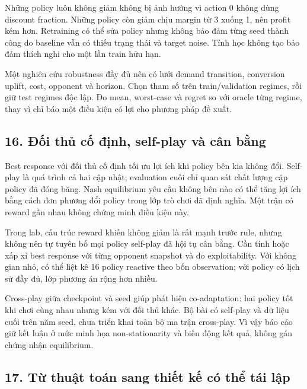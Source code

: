 Những policy luôn không giảm không bị ảnh hưởng vì action 0 không dùng
discount fraction. Những policy còn giảm chịu margin từ 3 xuống 1, nên
profit kém hơn. Retraining có thể sửa policy nhưng không bảo đảm từng
seed thành công do baseline vẫn có thiếu trạng thái và target noise.
Tính học không tạo bảo đảm thích nghi cho một lần train hữu hạn.

Một nghiên cứu robustness đầy đủ nên có lưới demand transition,
conversion uplift, cost, opponent và horizon. Chọn tham số trên
train/validation regimes, rồi giữ test regimes độc lập. Đo mean,
worst-case và regret so với oracle từng regime, thay vì chỉ báo một điều
kiện có lợi cho phương pháp đề xuất.

\subsection{16. Đối thủ cố định, self-play và cân
bằng}\label{ux111ux1ed1i-thux1ee7-cux1ed1-ux111ux1ecbnh-self-play-vuxe0-cuxe2n-bux1eb1ng}

Best response với đối thủ cố định tối ưu lợi ích khi policy bên kia
không đổi. Self-play là quá trình cả hai cập nhật; evaluation cuối chỉ
quan sát chất lượng cặp policy đã đóng băng. Nash equilibrium yêu cầu
không bên nào có thể tăng lợi ích bằng cách đơn phương đổi policy trong
lớp trò chơi đã định nghĩa. Một trận có reward gần nhau không chứng minh
điều kiện này.

Trong lab, cấu trúc reward khiến không giảm là rất mạnh trước rule,
nhưng không nên tự tuyên bố mọi policy self-play đã hội tụ cân bằng. Cần
tính hoặc xấp xỉ best response với từng opponent snapshot và đo
exploitability. Với không gian nhỏ, có thể liệt kê 16 policy reactive
theo bốn observation; với policy có lịch sử đầy đủ, lớp phương án rộng
hơn nhiều.

Cross-play giữa checkpoint và seed giúp phát hiện co-adaptation: hai
policy tốt khi chơi cùng nhau nhưng kém với đối thủ khác. Bộ bài có
self-play và dữ liệu cuối trên năm seed, chưa triển khai toàn bộ ma trận
cross-play. Vì vậy báo cáo giữ kết luận ở mức minh họa non-stationarity
và biến động kết quả, không gán chứng nhận equilibrium.

\subsection{17. Từ thuật toán sang thiết kế có thể tái
lập}\label{tux1eeb-thuux1eadt-touxe1n-sang-thiux1ebft-kux1ebf-cuxf3-thux1ec3-tuxe1i-lux1eadp}


